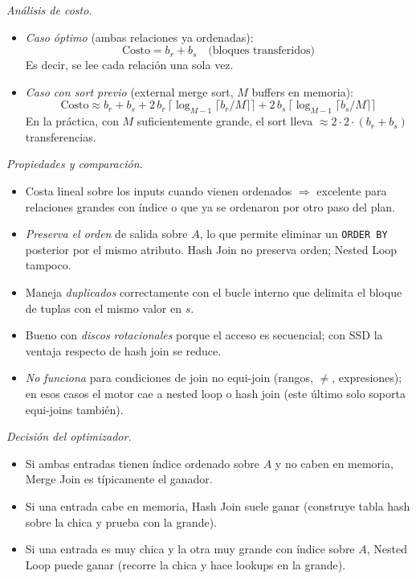 \documentclass[11pt,a4paper]{article}
\begin{document}
\textit{Análisis de costo.}

\begin{itemize}
    \item \emph{Caso óptimo} (ambas relaciones ya ordenadas):
    \[
    \text{Costo} = b_r + b_s \quad \text{(bloques transferidos)}
    \]
    Es decir, se lee cada relación una sola vez.
    \item \emph{Caso con sort previo} (external merge sort, $M$ buffers en memoria):
    \[
    \text{Costo} \approx b_r + b_s + 2\,b_r\,\lceil \log_{M-1}\!\lceil b_r/M \rceil \rceil + 2\,b_s\,\lceil \log_{M-1}\!\lceil b_s/M \rceil \rceil
    \]
    En la práctica, con $M$ suficientemente grande, el sort lleva $\approx 2 \cdot 2 \cdot (b_r + b_s)$ transferencias.
\end{itemize}

\textit{Propiedades y comparación.}

\begin{itemize}
    \item Costa lineal sobre los inputs cuando vienen ordenados $\Rightarrow$ excelente para relaciones grandes con índice o que ya se ordenaron por otro paso del plan.
    \item \emph{Preserva el orden} de salida sobre $A$, lo que permite eliminar un \texttt{ORDER BY} posterior por el mismo atributo. Hash Join no preserva orden; Nested Loop tampoco.
    \item Maneja \emph{duplicados} correctamente con el bucle interno que delimita el bloque de tuplas con el mismo valor en $s$.
    \item Bueno con \emph{discos rotacionales} porque el acceso es secuencial; con SSD la ventaja respecto de hash join se reduce.
    \item \emph{No funciona} para condiciones de join no equi-join (rangos, $\neq$, expresiones); en esos casos el motor cae a nested loop o hash join (este último solo soporta equi-joins también).
\end{itemize}

\textit{Decisión del optimizador.}

\begin{itemize}
    \item Si ambas entradas tienen índice ordenado sobre $A$ y no caben en memoria, Merge Join es típicamente el ganador.
    \item Si una entrada cabe en memoria, Hash Join suele ganar (construye tabla hash sobre la chica y prueba con la grande).
    \item Si una entrada es muy chica y la otra muy grande con índice sobre $A$, Nested Loop puede ganar (recorre la chica y hace lookups en la grande).
\end{itemize}
\end{document}
